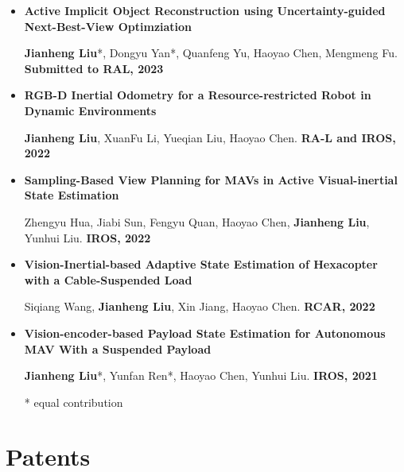\documentclass[11pt,a4paper,sans]{moderncv}        %
\begin{document}
\begin{itemize}

    \item{\textbf{Active Implicit Object Reconstruction using Uncertainty-guided Next-Best-View Optimziation}

    \small{\textbf{Jianheng Liu}*, Dongyu Yan*, Quanfeng Yu, Haoyao Chen, Mengmeng Fu. \textbf{Submitted to RAL, 2023}}
    }
    
    \vspace{3pt}


    \item{\textbf{RGB-D Inertial Odometry for a Resource-restricted Robot in Dynamic Environments}

    \small{\textbf{Jianheng Liu}, XuanFu Li, Yueqian Liu, Haoyao Chen. \textbf{RA-L and IROS, 2022}}
    }

    \vspace{3pt}

    \item{\textbf{Sampling-Based View Planning for MAVs in Active Visual-inertial State Estimation}

    \small{Zhengyu Hua, Jiabi Sun, Fengyu Quan, Haoyao Chen, \textbf{Jianheng Liu}, Yunhui Liu. \textbf{IROS, 2022}}
    }

    \vspace{3pt}

    
    \item{\textbf{Vision-Inertial-based Adaptive State Estimation of Hexacopter with a Cable-Suspended Load}

    \small{Siqiang Wang, \textbf{Jianheng Liu}, Xin Jiang, Haoyao Chen. \textbf{RCAR, 2022}}
    }

    \vspace{3pt}
    

    \item{\textbf{Vision-encoder-based Payload State Estimation for Autonomous MAV With a Suspended Payload}

    \small{\textbf{Jianheng Liu}*, Yunfan Ren*, Haoyao Chen, Yunhui Liu. \textbf{IROS, 2021}}
    }

\footnotesize{* equal contribution}

\end{itemize}

\section{Patents}

\end{document}
